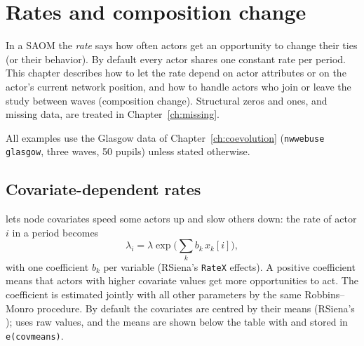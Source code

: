 \chapter{Rates and composition change}\label{ch:rates}
\begingroup\raggedright\sloppy

In a SAOM the \emph{rate} says how often actors get an opportunity to change their ties (or their behavior). By default every actor shares one constant rate per period. This chapter describes how to let the rate depend on actor attributes or on the actor's current network position, and how to handle actors who join or leave the study between waves (composition change). Structural zeros and ones, and missing data, are treated in Chapter~\ref{ch:missing}.

All examples use the Glasgow data of Chapter~\ref{ch:coevolution} (\texttt{nwwebuse glasgow}, three waves, 50 pupils) unless stated otherwise.

\section{Covariate-dependent rates}\label{sec:ratecov}

 lets node covariates speed some actors up and slow others down: the rate of actor $i$ in a period becomes
\[
  \lambda_i = \lambda \exp\Big(\sum_k b_k\,x_k[i]\Big),
\]
with one coefficient $b_k$ per variable (RSiena's \texttt{RateX} effects). A positive coefficient means that actors with higher covariate values get more opportunities to act. The coefficient is estimated jointly with all other parameters by the same Robbins--Monro procedure. By default the covariates are centred by their means (RSiena's );  uses raw values, and the means are shown below the table with  and stored in \texttt{e(covmeans)}.

